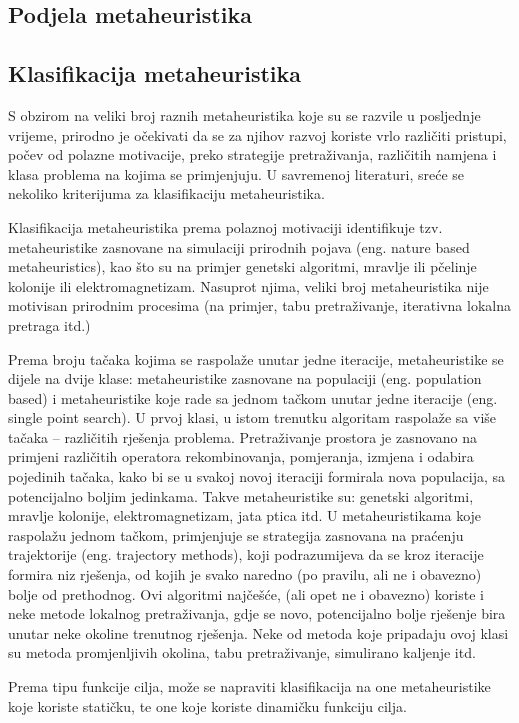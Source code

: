\documentclass[a4paper, utf8, 11pt, colorlinks]{book}
\begin{document}
 \subsection{Podjela metaheuristika}
 \subsection{Klasifikacija metaheuristika}
 S obzirom na veliki broj raznih metaheuristika koje su se razvile u posljednje vrijeme, prirodno je očekivati da se za  njihov razvoj koriste vrlo različiti pristupi, počev od polazne motivacije, preko strategije pretraživanja, različitih namjena i klasa problema na kojima se primjenjuju.
 U savremenoj literaturi, sreće se nekoliko kriterijuma za klasifikaciju metaheuristika.
 
 Klasifikacija metaheuristika prema polaznoj motivaciji identifikuje tzv. metaheuristike zasnovane na simulaciji prirodnih pojava (eng. nature based metaheuristics), kao što su na primjer genetski algoritmi, mravlje ili pčelinje kolonije ili elektromagnetizam. Nasuprot njima, veliki broj metaheuristika nije motivisan prirodnim procesima (na primjer, tabu pretraživanje, iterativna lokalna pretraga itd.)
 
 Prema broju tačaka kojima se raspolaže unutar jedne iteracije, metaheuristike se dijele na dvije klase: metaheuristike zasnovane na populaciji (eng. population based) i metaheuristike koje rade sa jednom tačkom unutar jedne iteracije (eng. single point search). U prvoj klasi, u istom trenutku algoritam raspolaže sa više tačaka -- različitih rješenja problema. Pretraživanje prostora je zasnovano na primjeni različitih operatora rekombinovanja, pomjeranja, izmjena i odabira pojedinih tačaka, kako bi se u svakoj novoj iteraciji formirala nova populacija, sa potencijalno boljim jedinkama. Takve metaheuristike su: genetski algoritmi, mravlje kolonije, elektromagnetizam, jata ptica itd.
 U metaheuristikama koje raspolažu jednom tačkom, primjenjuje se strategija zasnovana na praćenju trajektorije (eng. trajectory methods), koji podrazumijeva da se kroz iteracije formira niz rješenja, od kojih je svako naredno (po pravilu, ali ne i obavezno) bolje od prethodnog. Ovi algoritmi najčešće, (ali opet ne i obavezno) koriste i neke metode lokalnog pretraživanja, gdje se novo, potencijalno bolje rješenje bira unutar neke okoline trenutnog rješenja. Neke od metoda koje pripadaju ovoj klasi su metoda promjenljivih okolina, tabu pretraživanje, simulirano kaljenje itd.
 
 Prema tipu funkcije cilja, može se napraviti klasifikacija na one metaheuristike koje koriste statičku, te one koje koriste dinamičku funkciju cilja.
 
\end{document}
